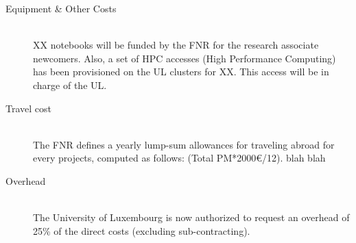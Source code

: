 \begin{description}
  \item[Equipment \& Other Costs]~\\
    XX notebooks will be funded by the FNR for the research associate newcomers.
    Also, a set of HPC accesses (High Performance Computing) has been
    provisioned on the UL clusters for XX. This access will be in charge of the UL. 


  \item[Travel cost]~\\
    The FNR defines a yearly lump-sum allowances for traveling abroad for every
    projects, computed as follows: (Total PM*2000\euro{}/12).
    blah blah


  \item[Overhead]~\\
    The University of Luxembourg is now authorized to request an overhead of
    25\% of the direct costs (excluding sub-contracting). 
\end{description}





% 
